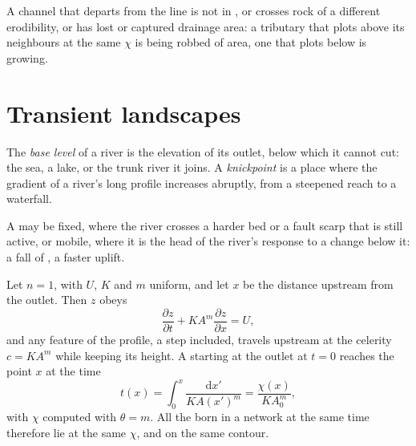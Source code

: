 A channel that departs from the line is not in , or crosses
rock of a different erodibility, or has lost or captured drainage area: a
tributary that plots above its neighbours at the same $\chi$ is being
robbed of area, one that plots below is growing.

\section{Transient landscapes}\label{sec:b3:quantitative-geomorphology:transient}

\begin{definition}\label{def:b3:quantitative-geomorphology:knickpoint}
The \emph{base level} of a river is the elevation of its
outlet, below which it cannot cut: the sea, a lake, or the trunk river it
joins. A \emph{knickpoint} is a place where the gradient
of a river's long profile increases abruptly, from a steepened reach to a
waterfall.
\end{definition}

A  may be fixed, where the river crosses a harder bed or a fault
scarp that is still active, or mobile, where it is the head of the
river's response to a change below it: a fall of , a faster
uplift.

\begin{theorem}\label{thm:b3:quantitative-geomorphology:kinematic}
Let $n = 1$, with $U$, $K$ and $m$ uniform, and let $x$ be the distance
upstream from the outlet. Then $z$ obeys
\[
\frac{\partial z}{\partial t} + K A^m \frac{\partial z}{\partial x} = U ,
\]
and any feature of the profile, a step included, travels upstream at the
celerity $c = K A^m$ while keeping its height. A  starting at
the outlet at $t = 0$ reaches the point $x$ at the time
\[
t(x) = \int_0^x \frac{\mathrm{d}x'}{K A(x')^m} = \frac{\chi(x)}{K A_0^m},
\]
with $\chi$ computed with $\theta = m$. All the  born in a network
at the same time therefore lie at the same $\chi$, and on the same contour.
\end{theorem}


